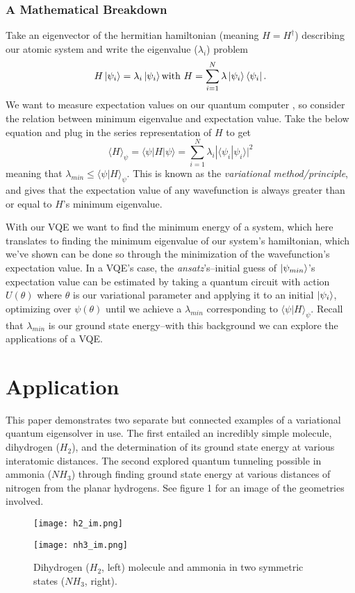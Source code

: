 \documentclass[10pt,twocolumn,letterpaper]{article}
\begin{document}
\subsubsection{A Mathematical Breakdown}
Take an eigenvector of the hermitian hamiltonian (meaning $H = H^\dagger$) describing our atomic system and write the eigenvalue ($\lambda_i$) problem 
$$H\ket{\psi_i}=\lambda_i\ket{\psi_i} \text{with } H = \displaystyle \sum_{i=1}^N\lambda\ket{\psi_i}\bra{\psi_i}.$$
We want to measure expectation values on our quantum computer \cite{vqe}, so consider the relation between minimum eigenvalue and expectation value. Take the below equation and plug in the series representation of $H$ to get
$$\langle H \rangle_\psi = \langle \psi | H | \psi \rangle = \displaystyle \sum_{i=1}^N \lambda_i | \langle \psi_i | \psi_i \rangle|^2 $$ meaning that $\lambda_{min} \leq \langle \psi | H \rangle_\psi$. This is known as the \textit{variational method/principle}, and gives that the expectation value of any wavefunction is always greater than or equal to $H$'s minimum eigenvalue.

With our VQE we want to find the minimum energy of a system, which here translates to finding the minimum eigenvalue of our system's hamiltonian, which we've shown can be done so through the minimization of the wavefunction's expectation value. In a VQE's case, the \textit{ansatz}'s--initial guess of $\ket{\psi_{min}}$'s expectation value can be estimated by taking a quantum circuit with action $U(\theta)$ where $\theta$ is our variational parameter and applying it to an initial $\ket{\psi_i}$, optimizing over $\psi(\theta)$ until we achieve a $\lambda_{min}$ corresponding to $\langle \psi | H \rangle_\psi$. Recall that $\lambda_{min}$ is our ground state energy--with this background we can explore the applications of a VQE.
\section{Application}
This paper demonstrates two separate but connected examples of a variational quantum eigensolver in use. The first entailed an incredibly simple molecule, dihydrogen ($H_2$), and the determination of its ground state energy at various interatomic distances. The second explored quantum tunneling possible in ammonia ($NH_3$) through finding ground state energy at various distances of nitrogen from the planar hydrogens. See figure 1 for an image of the geometries involved. 
\begin{figure}[h]
    \begin{minipage}{0.3\textwidth}
        \texttt{[image: h2\_im.png]}
        \label{1}
    \end{minipage}
    \hfill
    \begin{minipage}{0.5\textwidth}
        \texttt{[image: nh3\_im.png]}
    \end{minipage}
    \caption{Dihydrogen ($H_2$, left) molecule and ammonia in two symmetric states ($NH_3$, right).}
\end{figure}
\end{document}
